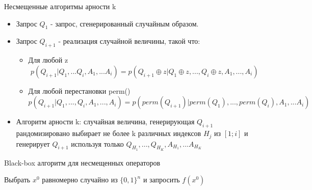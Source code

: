 \documentclass{beamer}
\begin{document}
 \begin{frame}{Несмещенные алгоритмы арности k}
  \begin{itemize}
   \item Запрос $Q_1$ - запрос, сгенерированный случайным образом.
   \item Запрос $Q_{i+1}$ - реализация случайной величины, такой что:
        \begin{itemize}
            
            \item  Для любой z $$ p(Q_{i+1} | Q_1, ... Q_i, A_1, ... A_i) = p(Q_{i+1} \oplus z | Q_1 \oplus z, ..., Q_i \oplus z, A_1, ..., A_i)$$  
            
            \item Для любой перестановки perm() 
            $  p(Q_{i+1} | Q_1, ..., Q_i, A_1, ..., A_i) = p(perm(Q_{i+1}) |perm(Q_1), ..., perm(Q_i), A_1, ... A_i) $ 
            
        \end{itemize}

 \item Алгоритм арности k: случайная величина, генерирующая $Q_{i+1}$ рандомизировано выбирает не более k различных индексов $H_j$ из $[1; i]$ и генерирует $Q_{i+1}$ используя только $Q_{H_1}, ..., Q_{H_K}, A_{H_1}, ... A_{H_K}$
  \end{itemize}
 \end{frame}
 
 \begin{frame}{Black-box алгоритм для несмещенных операторов} 
    \begin{algorithm}[H]
    \textrm{Выбрать $x^0$ равномерно случайно из $\{0,1\}^n$ и запросить $f(x^0)$ } \\
    \EndFor
    \end{algorithm}
 \end{frame}

 
\end{document}
